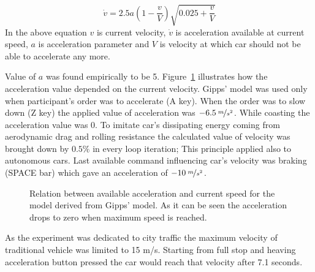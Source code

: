 \documentclass[11pt,english]{article}
\begin{document}
\begin{equation}
\dot{v}=2.5a(1- \frac{v}{V})\sqrt{0.025+ \frac{v}{V}}
\end{equation}
In the above equation $v$ is current velocity, $\dot{v}$ is acceleration available at current speed, $a$ is acceleration parameter and $V$ is velocity at which car should not be able to accelerate any more.

Value of $a$ was found empirically to be 5. Figure~\ref{fig:gipps} illustrates how the acceleration value depended on the current velocity. Gipps' model was used only when participant's order was to accelerate (A key). When the order was to slow down (Z key) the applied value of acceleration was $-6.5\:\nicefrac{m}{s^2}$. While coasting the acceleration value was $0$. To imitate car's dissipating energy coming from aerodynamic drag and rolling resistance the calculated value of velocity was brought down by $0.5\%$ in every loop iteration; This principle applied also to autonomous cars. Last available command influencing car's velocity was braking (SPACE bar) which gave an acceleration of $-10\:\nicefrac{m}{s^2}$.


\begin{figure}[!] %
\caption{Relation between available acceleration and current speed for the model derived from Gipps' model. As it can be seen the acceleration drops to zero when maximum speed is reached.}
\label{fig:gipps}
\end{figure} 

As the experiment was dedicated to city traffic the maximum velocity of traditional vehicle was limited to 15 m/s. Starting from full stop and heaving acceleration button pressed the car would reach that velocity after 7.1 seconds.
\end{document}
